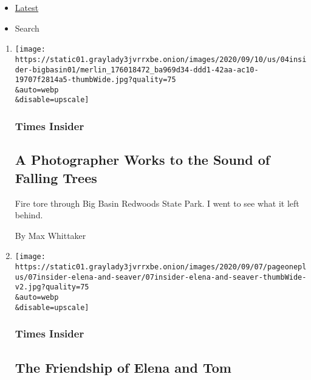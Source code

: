 \begin{itemize}
\tightlist
\item
  \protect\hyperlink{stream-panel}{Latest}
\item
  Search
\end{itemize}

\begin{enumerate}
\def\labelenumi{\arabic{enumi}.}
\item
  \href{/2020/09/10/insider/big-basin-fire-photography.html}{}

  \texttt{[image: https://static01.graylady3jvrrxbe.onion/images/2020/09/10/us/04insider-bigbasin01/merlin\_176018472\_ba969d34-ddd1-42aa-ac10-19707f2814a5-thumbWide.jpg?quality=75\\\&auto=webp\\\&disable=upscale]}

  \hypertarget{times-insider-2}{%
  \subsubsection{Times Insider}\label{times-insider-2}}

  \hypertarget{a-photographer-works-to-the-sound-of-falling-trees}{%
  \subsection{A Photographer Works to the Sound of Falling
  Trees}\label{a-photographer-works-to-the-sound-of-falling-trees}}

  Fire tore through Big Basin Redwoods State Park. I went to see what it
  left behind.

  By Max Whittaker
\item
  \href{/2020/09/07/insider/the-friendship-of-elena-and-tom.html}{}

  \texttt{[image: https://static01.graylady3jvrrxbe.onion/images/2020/09/07/pageoneplus/07insider-elena-and-seaver/07insider-elena-and-seaver-thumbWide-v2.jpg?quality=75\\\&auto=webp\\\&disable=upscale]}

  \hypertarget{times-insider-3}{%
  \subsubsection{Times Insider}\label{times-insider-3}}

  \hypertarget{the-friendship-of-elena-and-tom}{%
  \subsection{The Friendship of Elena and
  Tom}\label{the-friendship-of-elena-and-tom}}


\end{enumerate}
